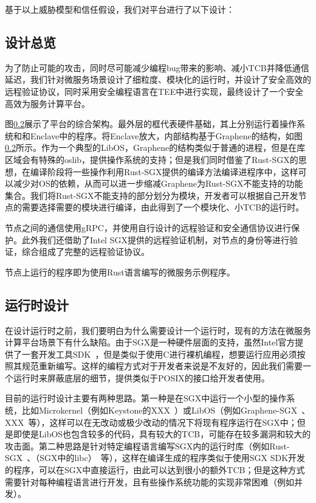 基于以上威胁模型和信任假设，我们对平台进行了以下设计：

\subsection{设计总览}

为了防止可能的攻击，同时尽可能减少编程bug带来的影响、减小TCB并降低通信延迟，我们针对微服务场景设计了细粒度、模块化的运行时，并设计了安全高效的远程验证协议，同时采用安全编程语言在TEE中进行实现，最终设计了一个安全高效为服务计算平台。


图\ref{}展示了平台的综合架构。最外层的框代表硬件基础，其上分别运行着操作系统和和Enclave中的程序。将Enclave放大，内部结构基于Graphene的结构，如图\ref{}所示。作为一个典型的LibOS，Graphene的结构类似于普通的进程，但是在库区域会有特殊的oslib，提供操作系统的支持；但是我们同时借鉴了Rust-SGX的思想，在编译阶段将一些操作利用Rust-SGX提供的编译方法编译进程序中，这样可以减少对OS的依赖，从而可以进一步缩减Graphene为Rust-SGX不能支持的功能集合。我们将Rust-SGX不能支持的部分划分为模块，开发者可以根据自己开发节点的需要选择需要的模块进行编译，由此得到了一个模块化、小TCB的运行时。

节点之间的通信使用gRPC，并使用自行设计的远程验证和安全通信协议进行保护。此外我们还借助了Intel SGX提供的远程验证机制，对节点的身份等进行验证，综合组成了完整的远程验证协议。

节点上运行的程序即为使用Rust语言编写的微服务示例程序。

\subsection{运行时设计}

在设计运行时之前，我们要明白为什么需要设计一个运行时，现有的方法在微服务计算平台场景下有什么缺陷。由于SGX是一种硬件层面的支持，虽然Intel官方提供了一套开发工具SDK~\cite{}，但是类似于使用C进行裸机编程，想要运行应用必须按照其规范重新编写。这样的编程方式对于开发者来说是不友好的，因此我们需要一个运行时来屏蔽底层的细节，提供类似于POSIX的接口给开发者使用。

目前的运行时设计主要有两种思路。第一种是在SGX中运行一个小型的操作系统，比如Microkernel（例如Keystone的XXX~\cite{}）或LibOS（例如Graphene-SGX~\cite{}、XXX~\cite{}等），这样可以在无改动或极少改动的情况下将现有程序运行在SGX中；但是即使是LibOS也包含较多的代码，具有较大的TCB，可能存在较多漏洞和较大的攻击面。第二种思路是针对特定编程语言编写SGX内的运行时库（例如Rust-SGX~\cite{}、（SGX中的libc）~\cite{}等），这样在编译生成的程序类似于使用SGX SDK开发的程序，可以在SGX中直接运行，由此可以达到很小的额外TCB；但是这种方式需要针对每种编程语言进行开发，且有些操作系统功能的实现非常困难（例如并发）。

